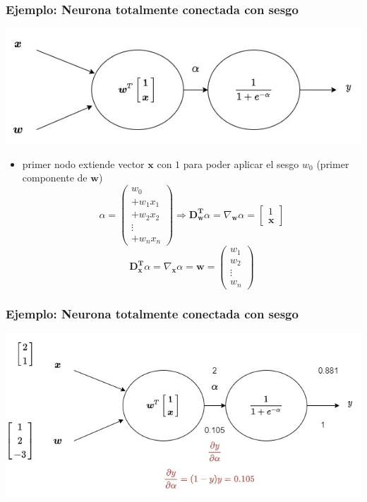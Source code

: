 \documentclass{beamer}
\begin{document}
\begin{frame}
\frametitle{Ejemplo: Neurona totalmente conectada con sesgo}
\includegraphics[scale=0.3]{im20}
\begin{itemize}
\item primer nodo extiende vector $\boldsymbol{x}$ con $1$ para poder aplicar el sesgo $w_0$ (primer componente de $\boldsymbol{w}$)
\begin{equation*}
\alpha = \begin{pmatrix}
w_0\\
+w_1 x_1\\
+w_2 x_2\\
\vdots \\
+w_n x_n
\end{pmatrix} \Rightarrow  \boldsymbol{D_{w}^T} \alpha = \nabla_{\boldsymbol{w}}\alpha = \begin{bmatrix} 1\\ \boldsymbol{x}\end{bmatrix} 
\end{equation*}
\begin{equation*}
  \boldsymbol{D_{x}^T} \alpha = \nabla_{\boldsymbol{x}}\alpha=\boldsymbol{w}= \begin{pmatrix}
w_1 \\ w_2 \\ \vdots \\ w_n  \end{pmatrix}
\end{equation*}

\end{itemize}

\end{frame}
\begin{frame}
\frametitle{Ejemplo: Neurona totalmente conectada con sesgo}
\includegraphics[scale=0.4]{im21}
\end{frame}
\end{document}
